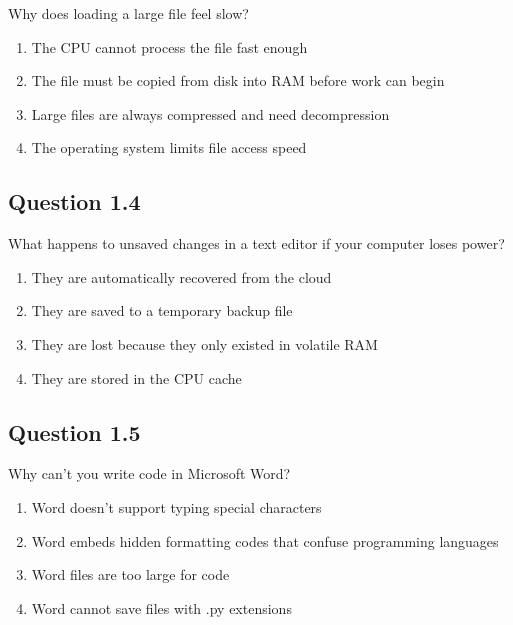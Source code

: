 \documentclass[
  letterpaper,
  DIV=11,
  numbers=noendperiod]{scrreprt}
\providecommand{\tightlist}{%
  \setlength{\itemsep}{0pt}\setlength{\parskip}{0pt}}
\begin{document}
Why does loading a large file feel slow?

\begin{enumerate}
\def\labelenumi{\Alph{enumi})}
\tightlist
\item
  The CPU cannot process the file fast enough\\
\item
  The file must be copied from disk into RAM before work can begin\\
\item
  Large files are always compressed and need decompression\\
\item
  The operating system limits file access speed
\end{enumerate}

\subsection{Question 1.4}\label{question-1.4}

What happens to unsaved changes in a text editor if your computer loses
power?

\begin{enumerate}
\def\labelenumi{\Alph{enumi})}
\tightlist
\item
  They are automatically recovered from the cloud\\
\item
  They are saved to a temporary backup file\\
\item
  They are lost because they only existed in volatile RAM\\
\item
  They are stored in the CPU cache
\end{enumerate}

\subsection{Question 1.5}\label{question-1.5}

Why can't you write code in Microsoft Word?

\begin{enumerate}
\def\labelenumi{\Alph{enumi})}
\tightlist
\item
  Word doesn't support typing special characters\\
\item
  Word embeds hidden formatting codes that confuse programming
  languages\\
\item
  Word files are too large for code\\
\item
  Word cannot save files with .py extensions
\end{enumerate}
\end{document}
